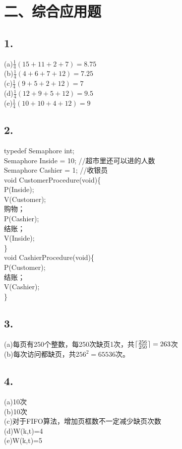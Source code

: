 \documentclass[UTF8]{ctexart}
\begin{document}
\section*{二、综合应用题}
\subsection*{1.}
(a)$\frac{1}{4}(15+11+2+7)=8.75$\\
(b)$\frac{1}{4}(4+6+7+12)=7.25$\\
(c)$\frac{1}{4}(9+5+2+12)=7$\\
(d)$\frac{1}{4}(12+9+5+12)=9.5$\\
(e)$\frac{1}{4}(10+10+4+12)=9$\\
\subsection*{2.}
typedef Semaphore int;\\
Semaphore Inside = 10; //超市里还可以进的人数\\
Semaphore Cashier = 1; //收银员\\
void CustomerProcedure(void)\{\\
    P(Inside);\\
    V(Customer);\\
    购物；\\
    P(Cashier);\\
    结账；\\
    V(Inside);\\
\}\\
void CashierProcedure(void)\{\\
    P(Customer);\\
    结账；\\
    V(Cashier);\\
\}\\
\subsection*{3.}
(a)每页有250个整数，每250次缺页1次，共$\lceil\frac{256\time256}{250}\rceil=263$次\\
(b)每次访问都缺页，共$256^2=65536$次。
\subsection*{4.}
(a)10次\\
(b)10次\\
(c)对于FIFO算法，增加页框数不一定减少缺页次数\\
(d)W(k,t)=4\\
(e)W(k,t)=5\\
\end{document}
